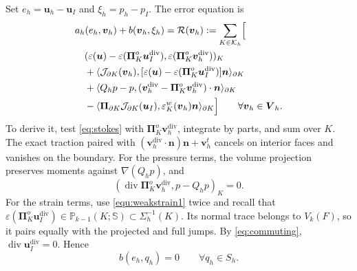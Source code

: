 \documentclass[review,hidelinks,onefignum,onetabnum]{siamart251216}
\newcommand{\AI}[1]{{\color{blue}#1}}
\begin{document}
\AI{Set $e_h=\boldsymbol u_h-\boldsymbol u_I$ and $\xi_h=p_h-p_I$.
The error equation is
\begin{equation}\label{eq:erroreq}
\begin{aligned}
&a_h(e_h,\boldsymbol v_h)+b(\boldsymbol v_h,\xi_h)
=\mathcal R(\boldsymbol v_h):=\sum_{K\in\mathcal K_h}\Bigl[\\
&\quad(\varepsilon(\boldsymbol u)-\varepsilon(\boldsymbol\Pi_K^o\boldsymbol u_I^{\operatorname{div}}),
 \varepsilon(\boldsymbol\Pi_K^o\boldsymbol v_h^{\operatorname{div}}))_K\\
&\quad+\langle\mathcal J_{\partial K}(\boldsymbol v_h),
 [\varepsilon(\boldsymbol u)-\varepsilon(\boldsymbol\Pi_K^o\boldsymbol u_I^{\operatorname{div}})]\boldsymbol n\rangle_{\partial K}\\
&\quad+\langle Q_hp-p,
 (\boldsymbol v_h^{\operatorname{div}}-\boldsymbol\Pi_K^o\boldsymbol v_h^{\operatorname{div}})\cdot\boldsymbol n\rangle_{\partial K}\\
&\quad-\langle\boldsymbol\Pi_{\partial K}\mathcal J_{\partial K}(\boldsymbol u_I),
 \varepsilon_K^w(\boldsymbol v_h)\boldsymbol n\rangle_{\partial K}\Bigr]
\qquad\forall\boldsymbol v_h\in\boldsymbol V_h.
\end{aligned}
\end{equation}
To derive it, test \eqref{eq:stokes} with
$\boldsymbol\Pi_K^o\boldsymbol v_h^{\operatorname{div}}$, integrate by parts,
and sum over $K$. The exact traction paired with
$(\boldsymbol v_h^{\operatorname{div}}\cdot\boldsymbol n)\boldsymbol n+\boldsymbol v_h^t$
cancels on interior faces and vanishes on the boundary.
For the pressure terms, the volume projection preserves moments against
$\nabla(Q_hp)$, and
\[
(\operatorname{div}\boldsymbol\Pi_K^o\boldsymbol v_h^{\operatorname{div}},p-Q_hp)_K=0.
\]
For the strain terms, use \eqref{equ:weakstrain1} twice and recall that
$\varepsilon(\boldsymbol\Pi_K^o\boldsymbol u_I^{\operatorname{div}})
\in\mathbb P_{k-1}(K;\mathbb S)\subset\Sigma_h^{-1}(K)$.
Its normal trace belongs to $V_k(F)$, so it pairs equally with the projected
and full jumps.
By \eqref{eq:commuting}, $\operatorname{div}\boldsymbol u_I^{\operatorname{div}}=0$.
Hence
\begin{equation}\label{eq:divergenceerror}
b(e_h,q_h)=0\qquad\forall q_h\in S_h.
\end{equation}}
\end{document}
